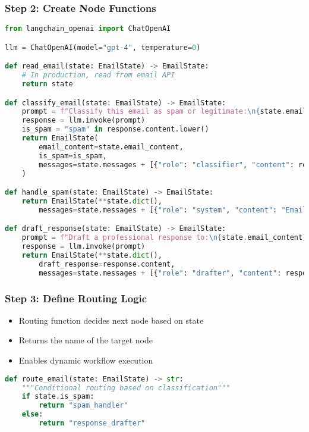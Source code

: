 \begin{frame}[fragile]\frametitle{Step 2: Create Node Functions}
      \begin{lstlisting}[language=Python, basicstyle=\tiny]
from langchain_openai import ChatOpenAI

llm = ChatOpenAI(model="gpt-4", temperature=0)

def read_email(state: EmailState) -> EmailState:
    # In production, read from email API
    return state

def classify_email(state: EmailState) -> EmailState:
    prompt = f"Classify this email as spam or legitimate:\n{state.email_content}\nRespond with only 'spam' or 'legitimate'."
    response = llm.invoke(prompt)
    is_spam = "spam" in response.content.lower()
    return EmailState(
        email_content=state.email_content,
        is_spam=is_spam,
        messages=state.messages + [{"role": "classifier", "content": response.content}]
    )

def handle_spam(state: EmailState) -> EmailState:
    return EmailState(**state.dict(), 
        messages=state.messages + [{"role": "system", "content": "Email marked as spam"}])

def draft_response(state: EmailState) -> EmailState:
    prompt = f"Draft a professional response to:\n{state.email_content}"
    response = llm.invoke(prompt)
    return EmailState(**state.dict(), 
        draft_response=response.content,
        messages=state.messages + [{"role": "drafter", "content": response.content}])
      \end{lstlisting}
\end{frame}

\begin{frame}[fragile]\frametitle{Step 3: Define Routing Logic}

      \begin{itemize}
        \item Routing function decides next node based on state
        \item Returns the name of the target node
        \item Enables dynamic workflow execution
      \end{itemize}
	  
      \begin{lstlisting}[language=Python, basicstyle=\tiny]
def route_email(state: EmailState) -> str:
    """Conditional routing based on classification"""
    if state.is_spam:
        return "spam_handler"
    else:
        return "response_drafter"
      \end{lstlisting}
      

\end{frame}

